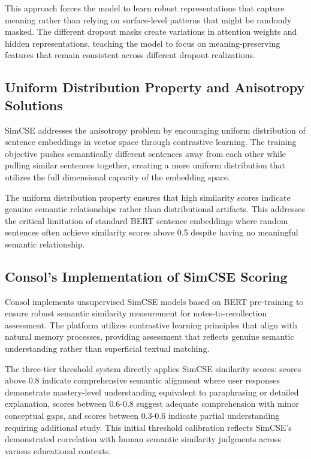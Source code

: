{{This approach forces the model to learn robust representations that capture meaning rather than relying on surface-level patterns that might be randomly masked. The different dropout masks create variations in attention weights and hidden representations, teaching the model to focus on meaning-preserving features that remain consistent across different dropout realizations.

\subsection{Uniform Distribution Property and Anisotropy Solutions}

SimCSE addresses the anisotropy problem by encouraging uniform distribution of sentence embeddings in vector space through contrastive learning. The training objective pushes semantically different sentences away from each other while pulling similar sentences together, creating a more uniform distribution that utilizes the full dimensional capacity of the embedding space.

The uniform distribution property ensures that high similarity scores indicate genuine semantic relationships rather than distributional artifacts. This addresses the critical limitation of standard BERT sentence embeddings where random sentences often achieve similarity scores above 0.5 despite having no meaningful semantic relationship.

\subsection{Consol's Implementation of SimCSE Scoring}

{\color{maroon}
Consol implements unsupervised SimCSE models based on BERT pre-training to ensure robust semantic similarity measurement for notes-to-recollection assessment. The platform utilizes contrastive learning principles that align with natural memory processes, providing assessment that reflects genuine semantic understanding rather than superficial textual matching.
}

The three-tier threshold system directly applies SimCSE similarity scores: scores above 0.8 indicate comprehensive semantic alignment where user responses demonstrate mastery-level understanding equivalent to paraphrasing or detailed explanation, scores between 0.6-0.8 suggest adequate comprehension with minor conceptual gaps, and scores between 0.3-0.6 indicate partial understanding requiring additional study. This initial threshold calibration reflects SimCSE's demonstrated correlation with human semantic similarity judgments across various educational contexts.

}}
